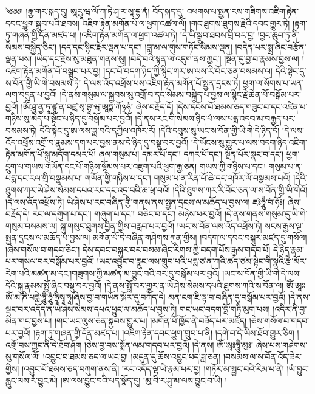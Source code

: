 ༄༅༅། །རྒྱ་གར་སྐད་དུ། ཨཱརྱཱ་ཝ་ལོ་ཀ་ཏེ་ཤྭ་ར་སཱ་དྷ་ནཾ། བོད་སྐད་དུ། འཕགས་པ་སྤྱན་རས་གཟིགས་འཇིག་རྟེན་དབང་ཕྱུག་སྒྲུབ་པའི་ཐབས། འཇིག་རྟེན་མགོན་པོ་ལ་ཕྱག་འཚལ་ལོ། །གང་ཐུགས་ཐུགས་རྗེའི་དབང་གྱུར་ཏེ། །རྟག་ཏུ་གཞན་གྱི་དོན་མཛད་པ། །འཇིག་རྟེན་མགོན་ལ་ཕྱག་འཚལ་ཏེ། །དེ་ཡི་སྒྲུབ་ཐབས་བྲི་བར་བྱ། །བྱང་ཆུབ་ཏུ་ནི་སེམས་བསྐྱེད་ཅིང་། །དད་དང་སྙིང་རྗེར་ལྡན་པ་དང་། །བླ་མ་ལ་གུས་གཏོང་སེམས་ལྡན། །བདེན་པར་སྨྲ་ཞིང་བརྩོན་ལྡན་པས། །ཡིད་དང་རྗེས་སུ་མཐུན་གནས་སུ། །བདེ་བའི་སྟན་ལ་འདུག་ནས་ཀྱང་། །སྔོན་དུ་བྱ་བ་རྣམས་བྱས་ལ། །འཇིག་རྟེན་མགོན་པོ་བསྒྲུབ་པར་བྱ། །དང་པོ་བདག་ཉིད་ཀྱི་སྙིང་གར་ཨ་ལས་རི་བོང་ཅན་བསམས་ལ། དེའི་སྟེང་དུ་ས་བོན་གྱི་ཡི་གེ་བསམས་ཏེ། དེ་ལས་འོད་འཕྲོས་པས་འཇིག་རྟེན་མགོན་པོ་སྤྱན་དྲངས་ཏེ། ཕྱག་ལ་སོགས་པ་ཡན་ལག་བདུན་པ་བྱའོ། །དེ་ནས་གསུམ་ལ་སྐྱབས་སུ་འགྲོ་བ་དང་སེམས་བསྐྱེད་པ་བྱས་ལ་སྙིང་རྗེ་ཆེན་པོ་བསྒོམ་པར་བྱའོ། །ཨོཾ་ཤཱུ་ནྱ་ཏཱ་ཛྙཱ་ན་བཛྲ་སྭ་བྷཱ་ཝ་ཨཱཏྨ་ཀོ྅ཧཾ། ཞེས་བརྗོད་དོ། །དེས་དངོས་པོ་ཐམས་ཅད་གཟུང་བ་དང་འཛིན་པ་གཉིས་སུ་མེད་པ་སྟོང་པ་ཉིད་དུ་བསྒོམ་པར་བྱའོ། །དེ་ནས་རང་གི་སེམས་ཉིད་པཾ་ལས་པདྨ་འདབ་མ་བརྒྱད་པར་བསམས་ཏེ། དེའི་སྟེང་དུ་ཨ་ལས་ཟླ་བའི་དཀྱིལ་འཁོར་རོ། །དེའི་དབུས་སུ་ཡང་ས་བོན་གྱི་ཡི་གེ་དེ་ཉིད་དོ། །དེ་ལས་འོད་འཕྲོས་འགྲོ་བ་རྣམས་དག་པར་བྱས་ནས་དེ་ཉིད་དུ་བསྡུ་བར་བྱའོ། །དེ་ཡོངས་སུ་གྱུར་པ་ལས་བདག་ཉིད་འཇིག་རྟེན་མགོན་པོ་སྐུ་མདོག་དམར་པོ། ཞལ་གསུམ་པ། དམར་པོ་དང་། དཀར་པོ་དང་། སྔོན་པོར་སྣང་བ་དང་། ཕྱག་དྲུག་པ་གཡས་གཡོན་དང་པོ་གཉིས་སྙོམས་པར་འཇུག་པའི་ཕྱག་རྒྱ་ཅན། གཡས་ཀྱི་གཉིས་པ་དང་། གསུམ་པ་ན་པདྨ་དང་རལ་གྲི་བསྣམས་པ། གཡོན་གྱི་གཉིས་པ་དང་། གསུམ་པ་ན་རིན་པོ་ཆེ་དང་འཁོར་ལོ་བསྣམས་པའོ། །དེའི་ཐུགས་ཀར་ཡེ་ཤེས་སེམས་དཔའ་རང་དང་འདྲ་བའི་ཆ་ཕྲ་བའོ། །དེའི་ཐུགས་ཀར་རི་བོང་ཅན་ལ་ས་བོན་གྱི་ཡི་གེའོ། །དེ་ལས་འོད་འཕྲོས་ཏེ། ཡེ་ཤེས་པ་རང་བཞིན་གྱི་གནས་ནས་སྤྱན་དྲངས་ལ་མཆོད་པ་བྱས་ལ། ཛཿཧཱུྃ་བཾ་ཧོཿ། ཞེས་བརྗོད་དེ། རང་ལ་དགུག་པ་དང་། གཞུག་པ་དང་། བཅིང་བ་དང་། མཉེས་པར་བྱའོ། །དེ་ནས་གནས་གསུམ་དུ་ཡི་གེ་གསུམ་བསམས་ལ། སྐུ་གསུང་ཐུགས་བྱིན་གྱིས་བརླབ་པར་བྱའོ། །ཡང་ས་བོན་ལས་འོད་འཕྲོས་ཏེ། སངས་རྒྱས་ལྔ་སྤྱན་དྲངས་ལ་མཆོད་པ་བྱས་ལ། མགོན་པོ་དེ་བཞིན་གཤེགས་ཀུན་གྱིས། །བདག་ལ་དབང་བསྐུར་མཛད་དུ་གསོལ། །ཞེས་གསོལ་བ་གདབ་ཅིང་། དེས་དབང་བསྐུར་བར་བསམ་ཞིང་རིགས་ཀྱི་བདག་པོས་རྒྱས་གདབ་པོ། དེ་ཉིད་རྣམ་པར་གསལ་བར་བསྒོམ་པར་བྱའོ། །ཡང་འབྱུང་བ་རླུང་ལས་གྲུབ་པའི་པདྨ་ཙ་ན་ཀའི་ཚད་ཙམ་སྟེང་གི་སྣའི་རྩེ་མོར་རེག་པའི་མཚན་མ་དང་།གཟུགས་ཀྱི་མཚན་མ་བྱུང་བའི་བར་དུ་བསྒོམ་པར་བྱའོ། །ཡང་ས་བོན་གྱི་ཡི་གེ་དེ་ལས་དེའི་སྐུ་རྣམས་སྤྲོ་ཞིང་བསྡུ་བར་བྱའོ། །དེ་ནས་སྤྲོ་བར་གྱུར་ན་ཡེ་ཤེས་སེམས་དཔའི་ཐུགས་ཀའི་ས་བོན་ལ། ཨོཾ་ཨཱཿཨོཾ་མ་ཎི་པདྨེ་ཧཱུྃ་ཧཱུཾ་ཧྲཱིསྭཱ་ཧཱ།ཞེས་བྱ་བ་གཡོན་སྐོར་དུ་བཀོད་དེ། མན་ངག་ཇི་ལྟ་བ་བཞིན་དུ་བསྒོམ་པར་བྱའོ། །དེ་ནས་ལྡང་བར་འདོད་ན་ཡེ་ཤེས་སེམས་དཔའ་ཕྱུང་ལ་མཆོད་པ་བྱས་ཏེ། གང་ཡང་བདག་བློ་གཏི་མུག་པས། །འདིར་ནི་བྱ་མིན་གང་བྱས་པ། །གང་ཡང་ལུས་ཅན་སྐྱབས་གྱུར་པ། །མགོན་པོ་ཁྱོད་ནི་བཟོད་པར་མཛོད། །ཅེས་གསོལ་བ་གདབ་པར་བྱའོ། །རྟག་ཏུ་གཞན་གྱི་དོན་མཛད་པ། །འཇིག་རྟེན་དབང་ཕྱུག་གྲུབ་པ་ནི། །དགེ་བ་དེ་ཡིས་ཐོབ་གྱུར་ཅིག །འགྲོ་བས་ཀྱང་ནི་དེ་ཐོབ་ཤོག །ཅེས་བྱ་བས་སྨོན་ལམ་གདབ་པར་བྱའོ། །དེ་ནས། ཨོཾ་ཨཱཿཧཱུྃ་མུཿ། ཞེས་པས་གཤེགས་སུ་གསོལ་ལོ། །འབྱུང་བ་ཐམས་ཅད་ལ་ཡང་བྱ། །མདུན་དུ་ཆོས་འབྱུང་པད་ཟླ་ཅན། །བསམས་ལ་ས་བོན་འོད་ཟེར་གྱིས། །འབྱུང་པོ་ཐམས་ཅད་བཀུག་ནས་ནི། །རང་འདོད་ལྷ་ཡི་རྣམ་པར་བྱ། །གཏོར་མ་སྦྱང་བའི་རིམ་པ་ནི། །ཡཾ་བྱུང་རླུང་ལས་རཾ་བྱུང་མེ། །ཨ་ལས་བྱུང་བའི་པད་སྣོད་དུ། །མུ་བི་ར་ཤུ་མ་ལས་བྱུང་བ་ཡི། །
